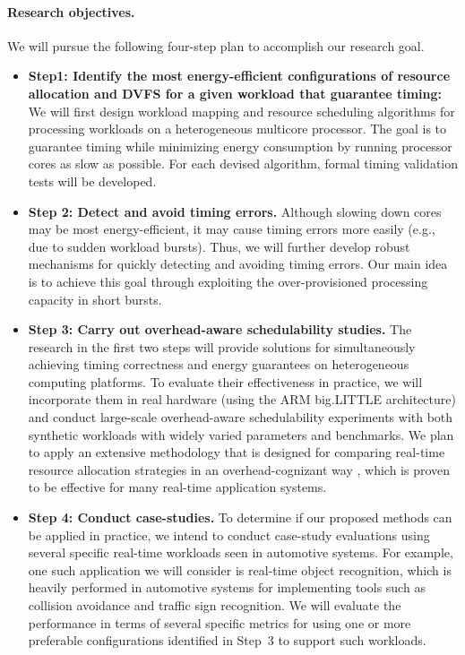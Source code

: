 \paragraph{Research objectives.} We will pursue the following four-step plan to accomplish our research goal.
\begin{itemize}
\item \textbf{Step1: Identify the most energy-efficient configurations of resource allocation and DVFS for a given workload that guarantee timing:} We will first design workload mapping and resource scheduling algorithms for processing workloads on a heterogeneous multicore processor. The goal is to  guarantee timing while minimizing energy consumption by running processor cores as slow as possible. For each devised algorithm, formal timing validation tests will be developed.  
\item \textbf{Step 2: Detect and avoid timing errors.} Although slowing down cores may be most energy-efficient, it may cause timing errors more easily (e.g., due to sudden workload bursts). Thus, we will further develop robust mechanisms for quickly detecting and avoiding timing errors. Our main idea is to achieve this goal through exploiting the over-provisioned processing capacity in short bursts.
\item \textbf{Step 3: Carry out overhead-aware schedulability studies.} The research in the first two steps will provide solutions for simultaneously achieving timing correctness and energy guarantees on heterogeneous computing platforms. To evaluate their effectiveness in practice, we will incorporate them in real hardware (using the ARM big.LITTLE architecture) and conduct large-scale overhead-aware schedulability experiments with both synthetic workloads with widely varied parameters and benchmarks. 
 We plan to apply an extensive methodology that is designed for comparing real-time resource allocation strategies in an overhead-cognizant way \cite{clustered, bastoni2010, BBBdissertation}, which is proven to be effective for many real-time application systems. 
\item \textbf{Step 4: Conduct case-studies.} To determine if our proposed methods can be applied in practice, we intend to conduct  case-study evaluations using several specific real-time workloads seen in automotive systems. For example, one such application we will consider is real-time object recognition, which is heavily performed in automotive systems for implementing tools such as collision avoidance and traffic sign recognition. We will evaluate the performance in terms of several specific metrics for using one or more preferable configurations identified in Step~3 to support such workloads. 
\end{itemize}

